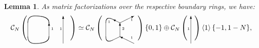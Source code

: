 \documentclass{amsart}
\theoremstyle{plain}
\newtheorem{lemma}[theorem]{Lemma}
\theoremstyle{definition}
\theoremstyle{remark}
\numberwithin{equation}{section}
\begin{document}
\begin{lemma}\label{lemma-MOY-decomps}\cite[Corollary 5.6, Lemma 3.11 and Proposition 7.1]{Wu-triple-trans}
As matrix factorizations over the respective boundary rings, we have: \vspace{1pc}
\begin{equation}\label{eq-MOY-I}
{\mathcal{C}}_N\left(
\setlength{\unitlength}{1pt}
\begin{picture}(61,20)(-31,20)

\put(0,10){\vector(0,1){20}}

\put(-30,10){\line(0,1){20}}

\qbezier(0,30)(0,40)(-20,40)

\qbezier(-30,30)(-30,40)(-20,40)

\qbezier(0,10)(0,0)(-20,0)

\qbezier(-30,10)(-30,0)(-20,0)

\put(20,0){\vector(0,1){40}}

\put(3,20){\tiny{$1$}}

\put(15,20){\tiny{$1$}}

\end{picture}
\right) \simeq {\mathcal{C}}_N\left(
\setlength{\unitlength}{1pt}
\begin{picture}(50,20)(-25,20)

\put(-10,5){\line(2,1){10}}

\put(20,0){\vector(-2,1){20}}

\put(0,30){\vector(-2,1){10}}

\put(0,30){\vector(2,1){20}}

\put(0,10){\vector(0,1){20}}

\qbezier(-10,35)(-20,40)(-20,30)

\qbezier(-10,5)(-20,0)(-20,10)

\put(-20,10){\line(0,1){20}}

\put(15,7){\tiny{$1$}}

\put(-17,30){\tiny{$1$}}

\put(15,33){\tiny{$1$}}

\put(3,20){\tiny{${2}$}}

\end{picture}
\right)\{0,1\} \oplus {\mathcal{C}}_N\left(
\setlength{\unitlength}{1pt}
\begin{picture}(10,20)(15,20)

\put(20,0){\vector(0,1){40}}

\put(15,20){\tiny{$1$}}

\end{picture}\right)\left\langle 1\right\rangle\{-1,1-N\},
\end{equation}


\end{lemma}
\end{document}
